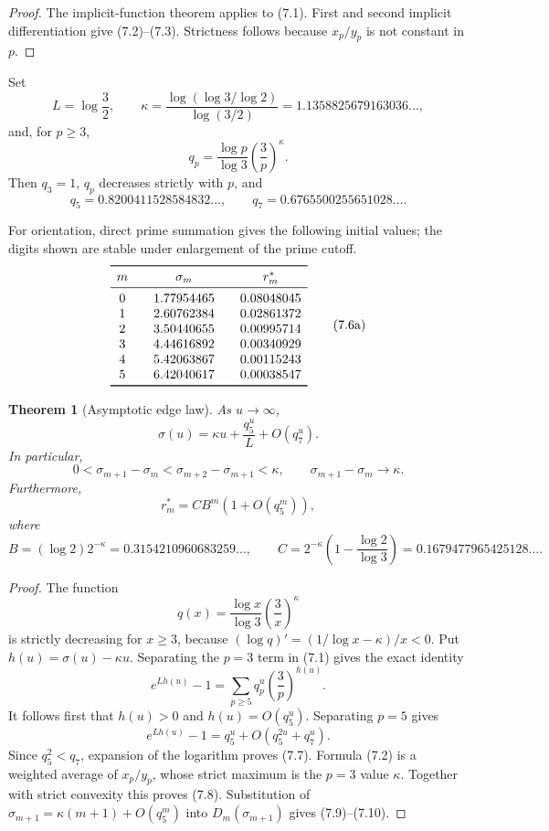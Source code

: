 \documentclass[11pt]{article}
\newtheorem{theorem}{Theorem}[section]
\theoremstyle{definition}
\theoremstyle{remark}
\begin{document}
\begin{proof}
The implicit-function theorem applies to (7.1).  First and second implicit
differentiation give (7.2)--(7.3).  Strictness follows because $x_p/y_p$ is not constant
in $p$.
\end{proof}

Set
\[
 L=\log\frac32,
 \qquad
 \kappa=\frac{\log(\log3/\log2)}{\log(3/2)}
 =1.1358825679163036\ldots,
\tag{7.4}
\]
and, for $p\ge3$,
\[
 q_p=\frac{\log p}{\log3}\left(\frac3p\right)^\kappa.
\tag{7.5}
\]
Then $q_3=1$, $q_p$ decreases strictly with $p$, and
\[
 q_5=0.8200411528584832\ldots,
 \qquad q_7=0.6765500255651028\ldots .
\tag{7.6}
\]

For orientation, direct prime summation gives the following initial values; the digits
shown are stable under enlargement of the prime cutoff.
\[
\begin{array}{c@{\qquad}c@{\qquad}c}
\toprule
m&\sigma_m&r_m^*\\
\midrule
0&1.77954465&0.08048045\\
1&2.60762384&0.02861372\\
2&3.50440655&0.00995714\\
3&4.44616892&0.00340929\\
4&5.42063867&0.00115243\\
5&6.42040617&0.00038547\\
\bottomrule
\end{array}
\tag{7.6a}
\]

\begin{theorem}[Asymptotic edge law]
\label{thm:edge-asymptotic}
As $u\to\infty$,
\[
 \boxed{
 \sigma(u)=\kappa u+\frac{q_5^u}{L}+O(q_7^u).
 }
\tag{7.7}
\]
In particular,
\[
 0<\sigma_{m+1}-\sigma_m
 <\sigma_{m+2}-\sigma_{m+1}<\kappa,
 \qquad
 \sigma_{m+1}-\sigma_m\longrightarrow\kappa.
\tag{7.8}
\]
Furthermore,
\[
 r_m^*=C B^m(1+O(q_5^m)),
\tag{7.9}
\]
where
\[
 B=(\log2)2^{-\kappa}=0.3154210960683259\ldots,
 \qquad
 C=2^{-\kappa}\left(1-\frac{\log2}{\log3}\right)
 =0.1679477965425128\ldots .
\tag{7.10}
\]
\end{theorem}

\begin{proof}
The function
\[
 q(x)=\frac{\log x}{\log3}\left(\frac3x\right)^\kappa
\]
is strictly decreasing for $x\ge3$, because
$(\log q)'=(1/\log x-\kappa)/x<0$.  Put
$h(u)=\sigma(u)-\kappa u$.  Separating the $p=3$ term in (7.1) gives the exact identity
\[
 \boxed{
 e^{Lh(u)}-1
 =\sum_{p\ge5}q_p^u\left(\frac3p\right)^{h(u)}.
 }
\tag{7.11}
\]
It follows first that $h(u)>0$ and $h(u)=O(q_5^u)$.  Separating $p=5$ gives
\[
 e^{Lh(u)}-1=q_5^u+O(q_5^{2u}+q_7^u).
\]
Since $q_5^2<q_7$, expansion of the logarithm proves (7.7).  Formula (7.2) is a
weighted average of $x_p/y_p$, whose strict maximum is the $p=3$ value $\kappa$.
Together with strict convexity this proves (7.8).  Substitution of
$\sigma_{m+1}=\kappa(m+1)+O(q_5^m)$ into
$D_m(\sigma_{m+1})$ gives (7.9)--(7.10).
\end{proof}
\end{document}
